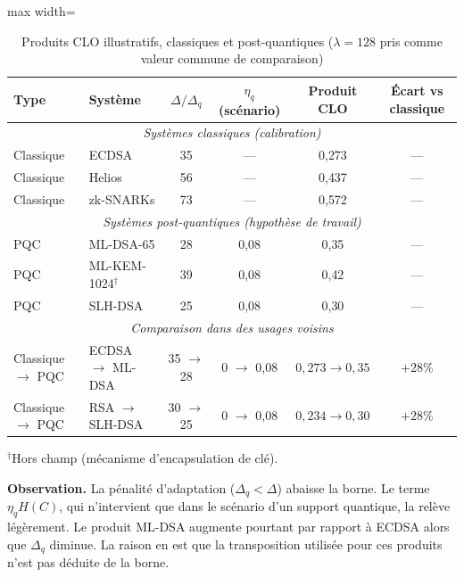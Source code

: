 \begin{sloppypar}
\begin{table}[H]
\centering
\caption{Produits CLO illustratifs, classiques et post-quantiques ($\lambda = 128$ pris comme valeur commune de comparaison)}
\label{tab:comparaison_produits_cro}
\small 
\setlength{\tabcolsep}{4pt} 
\begin{adjustbox}{max width=\linewidth} 
\begin{tabular}{@{}llcccc@{}}
\toprule
\textbf{Type} & \textbf{Syst\`eme} & $\Delta/\Delta_q$ & $\eta_q$ (sc\'enario) &
\textbf{Produit CLO} & \textbf{\'Ecart vs classique} \\
\midrule
\multicolumn{6}{c}{\textit{Syst\`emes classiques (calibration)}} \\
\midrule
Classique & ECDSA & 35 & --- & 0{,}273 & --- \\
Classique & Helios & 56 & --- & 0{,}437 & --- \\
Classique & zk-SNARKs & 73 & --- & 0{,}572 & --- \\
\midrule
\multicolumn{6}{c}{\textit{Syst\`emes post-quantiques (hypoth\`ese de travail)}} \\
\midrule
PQC & ML-DSA-65 & 28 & 0{,}08 & 0{,}35 & --- \\
PQC & ML-KEM-1024$^\dagger$ & 39 & 0{,}08 & 0{,}42 & --- \\
PQC & SLH-DSA & 25 & 0{,}08 & 0{,}30 & --- \\
\midrule
\multicolumn{6}{c}{\textit{Comparaison dans des usages voisins}} \\
\midrule
Classique $\to$ PQC & ECDSA $\to$ ML-DSA & 35 $\to$ 28 & 0 $\to$ 0{,}08 &
  $0{,}273 \to 0{,}35$ & $+28\%$ \\
Classique $\to$ PQC & RSA $\to$ SLH-DSA & 30 $\to$ 25 & 0 $\to$ 0{,}08 &
  $0{,}234 \to 0{,}30$ & $+28\%$ \\
\bottomrule
\end{tabular}
\end{adjustbox}

\vspace{0.2cm} 
{\footnotesize $^\dagger$Hors champ (m\'ecanisme d'encapsulation de cl\'e).\par}
\end{table} 
\noindent\textbf{Observation.} La p\'enalit\'e d'adaptation ($\Delta_q < \Delta$)
abaisse la borne. Le terme $\eta_q H(C)$, qui n'intervient que dans le sc\'enario
d'un support quantique, la rel\`eve l\'eg\`erement. Le produit
ML-DSA augmente pourtant par rapport \`a ECDSA alors que $\Delta_q$ diminue. La raison en est que la transposition utilis\'ee pour ces produits n'est pas d\'eduite de la borne.


\end{sloppypar}
